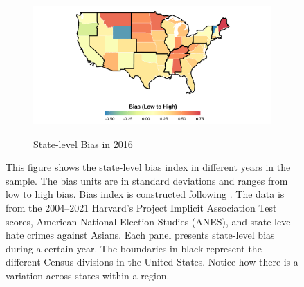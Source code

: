 \begin{center}
\begin{figure}[H]
\begin{subfigure}{.45\textwidth}
\label{fig:skiniat-map-2008}
\end{subfigure}
\hfill%
\begin{subfigure}{.45\textwidth}
\caption{State-level Bias in 2016}
\centering
\includegraphics[width=0.9\linewidth]{2016skinmap.png} 
\label{fig:skiniat-map-2010}
\end{subfigure}

\caption*{\footnotesize{This figure shows the state-level bias index in different years in the sample. The bias units are in standard deviations and ranges from low to high bias. Bias index is constructed following \textcite{lubotskyInterpretationRegressionsMultiple2006}. The data is from the 2004--2021 Harvard's Project Implicit Association Test scores, American National Election Studies (ANES), and state-level hate crimes against Asians. Each panel presents state-level bias during a certain year. The boundaries in black represent the different Census divisions in the United States. Notice how there is a variation across states within a region.}}
\end{figure}
\end{center}

\newpage
\pagebreak

